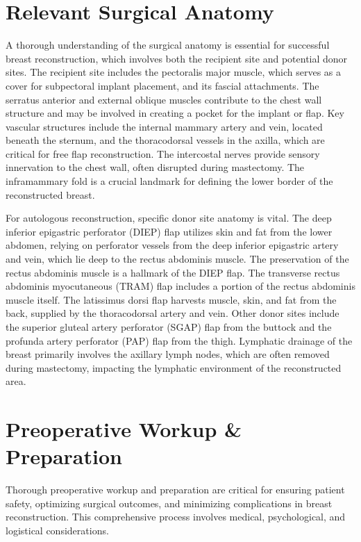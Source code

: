 \section*{Relevant Surgical Anatomy}
A thorough understanding of the surgical anatomy is essential for successful breast reconstruction, which involves both the recipient site and potential donor sites. The recipient site includes the pectoralis major muscle, which serves as a cover for subpectoral implant placement, and its fascial attachments. The serratus anterior and external oblique muscles contribute to the chest wall structure and may be involved in creating a pocket for the implant or flap. Key vascular structures include the internal mammary artery and vein, located beneath the sternum, and the thoracodorsal vessels in the axilla, which are critical for free flap reconstruction. The intercostal nerves provide sensory innervation to the chest wall, often disrupted during mastectomy. The inframammary fold is a crucial landmark for defining the lower border of the reconstructed breast.

For autologous reconstruction, specific donor site anatomy is vital. The deep inferior epigastric perforator (DIEP) flap utilizes skin and fat from the lower abdomen, relying on perforator vessels from the deep inferior epigastric artery and vein, which lie deep to the rectus abdominis muscle. The preservation of the rectus abdominis muscle is a hallmark of the DIEP flap. The transverse rectus abdominis myocutaneous (TRAM) flap includes a portion of the rectus abdominis muscle itself. The latissimus dorsi flap harvests muscle, skin, and fat from the back, supplied by the thoracodorsal artery and vein. Other donor sites include the superior gluteal artery perforator (SGAP) flap from the buttock and the profunda artery perforator (PAP) flap from the thigh. Lymphatic drainage of the breast primarily involves the axillary lymph nodes, which are often removed during mastectomy, impacting the lymphatic environment of the reconstructed area.

\section*{Preoperative Workup \& Preparation}
Thorough preoperative workup and preparation are critical for ensuring patient safety, optimizing surgical outcomes, and minimizing complications in breast reconstruction. This comprehensive process involves medical, psychological, and logistical considerations.

